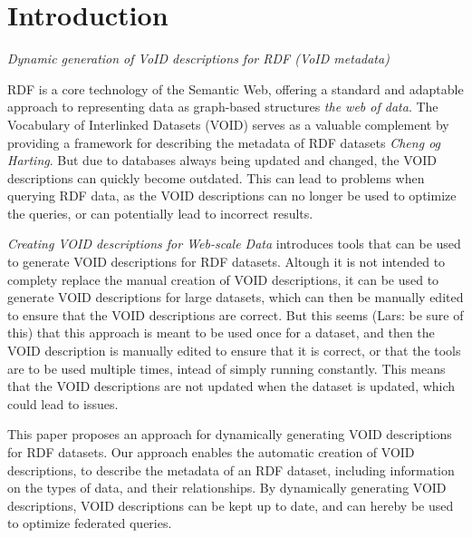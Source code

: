 \section{Introduction}\label{sec:introduction2}
\emph{Dynamic generation of VoID descriptions for RDF (VoID metadata)}

RDF is a core technology of the Semantic Web, offering a standard and adaptable approach to representing data as graph-based structures \emph{the web of data}. The Vocabulary of Interlinked Datasets (VOID) serves as a valuable complement by providing a framework for describing the metadata of RDF datasets \emph{Cheng og Harting}. But due to databases always being updated and changed, the VOID descriptions can quickly become outdated. This can lead to problems when querying RDF data, as the VOID descriptions can no longer be used to optimize the queries, or can potentially lead to incorrect results.

\emph{Creating VOID descriptions for Web-scale Data} introduces tools that can be used to generate VOID descriptions for RDF datasets. Altough it is not intended to complety replace the manual creation of VOID descriptions, it can be used to generate VOID descriptions for large datasets, which can then be manually edited to ensure that the VOID descriptions are correct. But this seems (Lars: be sure of this) that this approach is meant to be used once for a dataset, and then the VOID description is manually edited to ensure that it is correct, or that the tools are to be used multiple times, intead of simply running constantly. This means that the VOID descriptions are not updated when the dataset is updated, which could lead to issues.

This paper proposes an approach for dynamically generating VOID descriptions for RDF datasets. Our approach enables the automatic creation of VOID descriptions, to describe the metadata of an RDF dataset, including information on the types of data, and their relationships. By dynamically generating VOID descriptions, VOID descriptions can be kept up to date, and can hereby be used to optimize federated queries. 




